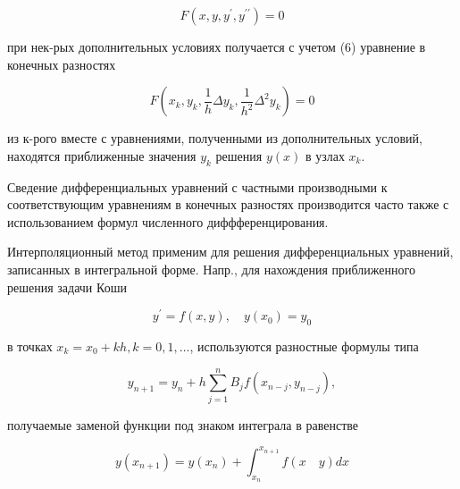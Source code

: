 \documentclass[10pt]{article}
\begin{document}
\[

F\left(x, y, y^{\prime}, y^{\prime \prime}\right)=0

\]



при нек-рых дополнительных условиях получается с учетом (6) уравнение в конечных разностях



\[

F\left(x_{k}, y_{k}, \frac{1}{h} \Delta y_{k}, \frac{1}{h^{2}} \Delta^{2} y_{k}\right)=0

\]



из к-рого вместе с уравнениями, полученными из дополнительных условий, находятся приближенные значения $y_{k}$ решения $y(x)$ в узлах $x_{k}$.



Сведение дифференциальных уравнений с частными производными $к$ соответствующим уравнениям в конечных разностях производится часто также с использованием формул численного диффференцирования.



Интерполяционный метод применим для решения дифференциальных уравнений, записанных в интегральной форме. Напр., для нахождения приближенного решения задачи Коши



\[

y^{\prime}=f(x, y), \quad y\left(x_{0}\right)=y_{0}

\]



в точках $x_{k}=x_{0}+k h, k=0,1, \ldots$, используются разностные формулы типа



\[

y_{n+1}=y_{n}+h \sum_{j=1}^{n} B_{j} f\left(x_{n-j}, y_{n-j}\right),

\]



получаемые заменой функции под знаком интеграла в равенстве



\[

y\left(x_{n+1}\right)=y\left(x_{n}\right)+\int_{x_{n}}^{x_{n+1}} f(x \quad y) d x

\]
\end{document}
